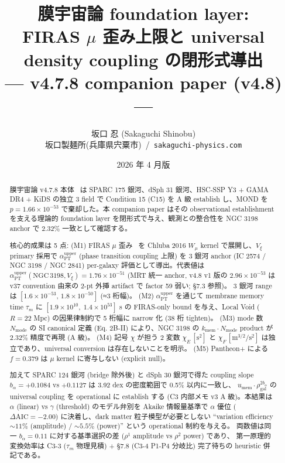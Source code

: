 \documentclass[11pt,a4paper]{ltjsarticle}
\title{\bfseries 膜宇宙論 foundation layer:\\
FIRAS $\mu$ 歪み上限と universal density coupling の閉形式導出\\[2pt]
\large --- v4.7.8 companion paper (v4.8) ---}
\author{坂口 忍 (Sakaguchi Shinobu)\\
\small 坂口製麺所(兵庫県宍粟市)~/~\texttt{sakaguchi-physics.com}}
\date{2026 年 4 月版}
\newcommand{\kmem}{k_{\mathrm{mem}}}
\newcommand{\Vxi}{V_{\xi}}
\newcommand{\Nmode}{N_{\mathrm{mode}}}
\newcommand{\aPT}{\alpha_{\mathrm{PT}}}
\newcommand{\taum}{\tau_{m}}
\newcommand{\bal}{b_{\alpha}}
\newcommand{\umem}{u_{\mathrm{mem}}}
\newcommand{\rhogal}{\rho_{\mathrm{gal}}}
\newcommand{\Wmu}{W_{\mu}}
\newcommand{\AIC}{\Delta\mathrm{AIC}}
\begin{document}
\maketitle
\thispagestyle{empty}

\begin{abstract}
\small\noindent
膜宇宙論 v4.7.8 本体~\citep{Sakaguchi2026a} は SPARC 175 銀河、dSph 31 銀河、HSC-SSP Y3 + GAMA DR4 + KiDS
の独立 3 field で Condition 15 (C15) を A 級 establish し、MOND を
$p = 1.66 \times 10^{-53}$ で棄却した。本 companion paper はその observational establishment
を支える理論的 foundation layer を閉形式で与え、観測との整合性を NGC 3198 anchor で 2.32\% 一致として確認する。

\smallskip\noindent
核心的成果は 5 点:
(M1) FIRAS $\mu$ 歪み~\citep{Fixsen1996} を Chluba 2016 $\Wmu$ kernel で展開し、$\Vxi$ primary 採用で
$\aPT^{\mathrm{upper}}$ (phase transition coupling 上限) を 3 銀河 anchor (IC 2574 / NGC 3198 / NGC 2841)
per-galaxy 評価として導出。代表値は $\aPT^{\mathrm{upper}}(\mathrm{NGC\,3198}, \Vxi) = 1.76 \times 10^{-51}$
(MRT 統一 anchor, v4.8 v1 版の $2.96 \times 10^{-53}$ は v37 convention 由来の 2-pt 外挿 artifact で factor 59 弱い; \S 7.3 参照)。
3 銀河 range は $[1.6 \times 10^{-53},\, 1.8 \times 10^{-50}]$ (≈3 桁幅)。
(M2) $\aPT^{\mathrm{upper}}$ を通じて membrane memory time $\taum$ に
$[1.9 \times 10^{10},\; 1.4 \times 10^{53}]$ s の FIRAS-only bound を与え、Local Void ($R=22$ Mpc)
の因果律制約で 5 桁幅に narrow 化 (38 桁 tighten)。
(M3) mode 数 $\Nmode$ の SI canonical 定義 (Eq. 2B-II) により、NGC 3198 の
$\kmem \cdot \Nmode$ product が 2.32\% 精度で再現 (A 級)。
(M4) 記号 $\chi$ が担う 2 変数 $\chi_E\,[\mathrm{s}^2]$ と $\chi_F\,[\mathrm{m}^{3/2}/\mathrm{s}^2]$
は独立であり、universal conversion は存在しないことを明示。
(M5) Pantheon+ \citep{Scolnic2022} による $f=0.379$ は $\mu$ kernel に寄与しない (explicit null)。

\smallskip\noindent
加えて SPARC 124 銀河 (bridge 除外後) と dSph 30 銀河で得た coupling slope
$\bal = +0.1084$ vs $+0.1127$ は 3.92 dex の密度範囲で 0.5\% 以内に一致し、
$\umem \cdot \rhogal^{2\bal}$ の universal coupling を operational に establish する
(C3 内部メモ v3 A 級)。本結果は $\alpha$ (linear) vs $\gamma$ (threshold) のモデル弁別を
Akaike 情報量基準で $\alpha$ 優位 ($\AIC = -2.00$) に決着し、dark matter 粒子模型が必要としない
``variation efficiency $\sim 11\%$ (amplitude) / $\sim 5.5\%$ (power)'' という operational 制約を与える。
両数値は同一 $\bal=0.11$ に対する基準選択の差 ($\rho^1$ amplitude vs $\rho^2$ power) であり、
第一原理的変換効率は C3-3 ($\taum$ 物理見積) + \S 7.8 (C3-4 P1-P4 分岐比) 完了待ちの heuristic 併記である。


\end{abstract}
\end{document}
